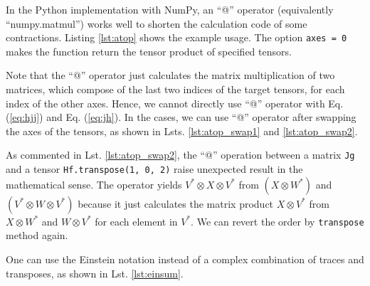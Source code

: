 \documentclass[a4paper]{article}
\begin{document}
In the Python implementation with NumPy, an ``@'' operator (equivalently ``numpy.matmul'') works well
to shorten the calculation code of some contractions.
Listing \ref{lst:atop} shows the example usage.
The option \texttt{axes = 0} makes the function return the tensor product of specified tensors.
\begin{center}
    
\end{center}
Note that the ``@'' operator just calculates the matrix multiplication of two matrices,
which compose of the last two indices of the target tensors, for each index of the other axes.
Hence, we cannot directly use ``@'' operator with Eq. (\ref{eq:hjj}) and Eq. (\ref{eq:jh}).
In the cases, we can use ``@'' operator after swapping the axes of the tensors,
as shown in Lsts. \ref{lst:atop_swap1} and \ref{lst:atop_swap2}.
\begin{center}
    
\end{center}
As commented in Lst. \ref{lst:atop_swap2},
the ``@'' operation between a matrix \texttt{Jg} and a tensor \texttt{Hf.transpose(1, 0, 2)} raise unexpected result
in the mathematical sense.
The operator yields $V^* \otimes X \otimes V^*$ from $(X\otimes W^*)$ and $(V^* \otimes W \otimes V^*)$
because it just calculates the matrix product $X \otimes V^*$ from
$X\otimes W^*$ and $W\otimes V^*$ for each element in $V^*$.
We can revert the order by \texttt{transpose} method again.
\begin{center}
    
\end{center}
One can use the Einstein notation instead of a complex combination of traces and transposes,
as shown in Lst. \ref{lst:einsum}.
\begin{center}
    
\end{center}
\end{document}
